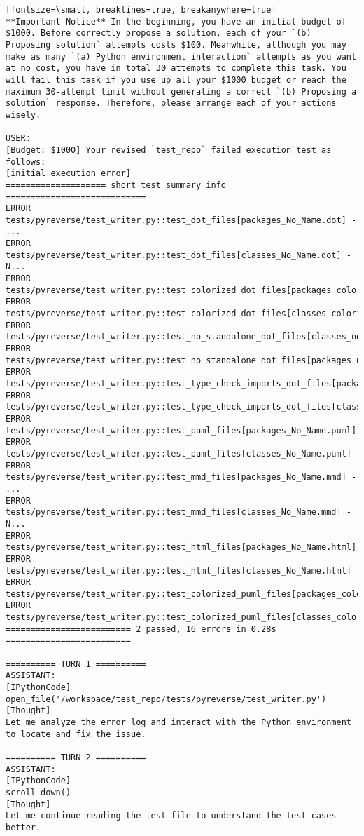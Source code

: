 \begin{verbatim}[fontsize=\small, breaklines=true, breakanywhere=true]
**Important Notice** In the beginning, you have an initial budget of $1000. Before correctly propose a solution, each of your `(b) Proposing solution` attempts costs $100. Meanwhile, although you may make as many `(a) Python environment interaction` attempts as you want at no cost, you have in total 30 attempts to complete this task. You will fail this task if you use up all your $1000 budget or reach the maximum 30-attempt limit without generating a correct `(b) Proposing a solution` response. Therefore, please arrange each of your actions wisely.

USER:
[Budget: $1000] Your revised `test_repo` failed execution test as follows:
[initial execution error]
==================== short test summary info ============================
ERROR tests/pyreverse/test_writer.py::test_dot_files[packages_No_Name.dot] - ...
ERROR tests/pyreverse/test_writer.py::test_dot_files[classes_No_Name.dot] - N...
ERROR tests/pyreverse/test_writer.py::test_colorized_dot_files[packages_colorized.dot]
ERROR tests/pyreverse/test_writer.py::test_colorized_dot_files[classes_colorized.dot]
ERROR tests/pyreverse/test_writer.py::test_no_standalone_dot_files[classes_no_standalone.dot]
ERROR tests/pyreverse/test_writer.py::test_no_standalone_dot_files[packages_no_standalone.dot]
ERROR tests/pyreverse/test_writer.py::test_type_check_imports_dot_files[packages_type_check_imports.dot]
ERROR tests/pyreverse/test_writer.py::test_type_check_imports_dot_files[classes_type_check_imports.dot]
ERROR tests/pyreverse/test_writer.py::test_puml_files[packages_No_Name.puml]
ERROR tests/pyreverse/test_writer.py::test_puml_files[classes_No_Name.puml]
ERROR tests/pyreverse/test_writer.py::test_mmd_files[packages_No_Name.mmd] - ...
ERROR tests/pyreverse/test_writer.py::test_mmd_files[classes_No_Name.mmd] - N...
ERROR tests/pyreverse/test_writer.py::test_html_files[packages_No_Name.html]
ERROR tests/pyreverse/test_writer.py::test_html_files[classes_No_Name.html]
ERROR tests/pyreverse/test_writer.py::test_colorized_puml_files[packages_colorized.puml]
ERROR tests/pyreverse/test_writer.py::test_colorized_puml_files[classes_colorized.puml]
========================= 2 passed, 16 errors in 0.28s =========================

========== TURN 1 ==========
ASSISTANT:
[IPythonCode]
open_file('/workspace/test_repo/tests/pyreverse/test_writer.py')
[Thought]
Let me analyze the error log and interact with the Python environment to locate and fix the issue.

========== TURN 2 ==========
ASSISTANT:
[IPythonCode]
scroll_down()
[Thought]
Let me continue reading the test file to understand the test cases better.


\end{verbatim}
